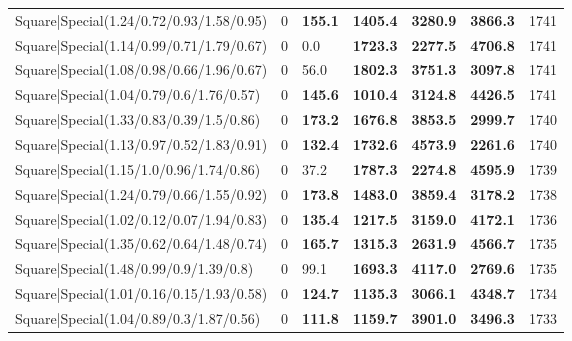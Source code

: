 \begin{tabular}{lrllllr}
 Square|Special(1.24/0.72/0.93/1.58/0.95)                      &             0   & \textbf{155.1} & \textbf{1405.4} & \textbf{3280.9} & \textbf{3866.3} &         1741 \\
 Square|Special(1.14/0.99/0.71/1.79/0.67)                      &             0   & 0.0            & \textbf{1723.3} & \textbf{2277.5} & \textbf{4706.8} &         1741 \\
 Square|Special(1.08/0.98/0.66/1.96/0.67)                      &             0   & 56.0           & \textbf{1802.3} & \textbf{3751.3} & \textbf{3097.8} &         1741 \\
 Square|Special(1.04/0.79/0.6/1.76/0.57)                       &             0   & \textbf{145.6} & \textbf{1010.4} & \textbf{3124.8} & \textbf{4426.5} &         1741 \\
 Square|Special(1.33/0.83/0.39/1.5/0.86)                       &             0   & \textbf{173.2} & \textbf{1676.8} & \textbf{3853.5} & \textbf{2999.7} &         1740 \\
 Square|Special(1.13/0.97/0.52/1.83/0.91)                      &             0   & \textbf{132.4} & \textbf{1732.6} & \textbf{4573.9} & \textbf{2261.6} &         1740 \\
 Square|Special(1.15/1.0/0.96/1.74/0.86)                       &             0   & 37.2           & \textbf{1787.3} & \textbf{2274.8} & \textbf{4595.9} &         1739 \\
 Square|Special(1.24/0.79/0.66/1.55/0.92)                      &             0   & \textbf{173.8} & \textbf{1483.0} & \textbf{3859.4} & \textbf{3178.2} &         1738 \\
 Square|Special(1.02/0.12/0.07/1.94/0.83)                      &             0   & \textbf{135.4} & \textbf{1217.5} & \textbf{3159.0} & \textbf{4172.1} &         1736 \\
 Square|Special(1.35/0.62/0.64/1.48/0.74)                      &             0   & \textbf{165.7} & \textbf{1315.3} & \textbf{2631.9} & \textbf{4566.7} &         1735 \\
 Square|Special(1.48/0.99/0.9/1.39/0.8)                        &             0   & 99.1           & \textbf{1693.3} & \textbf{4117.0} & \textbf{2769.6} &         1735 \\
 Square|Special(1.01/0.16/0.15/1.93/0.58)                      &             0   & \textbf{124.7} & \textbf{1135.3} & \textbf{3066.1} & \textbf{4348.7} &         1734 \\
 Square|Special(1.04/0.89/0.3/1.87/0.56)                       &             0   & \textbf{111.8} & \textbf{1159.7} & \textbf{3901.0} & \textbf{3496.3} &         1733 \\

\end{tabular}
